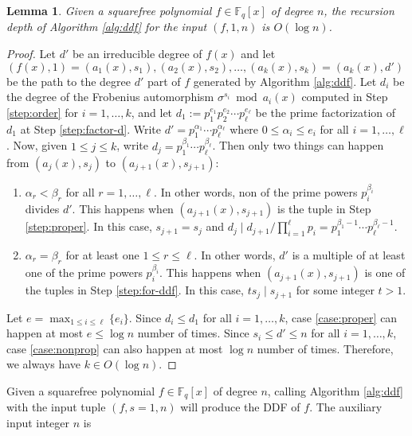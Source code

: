 \documentclass[11pt]{article}
\theoremstyle{plain}
\newtheorem{lemma}[theorem]{Lemma}
\theoremstyle{definition}
\def\F{\ensuremath{\mathbb{F}}}
\begin{document}
\begin{lemma}
	\label{lem:depth}
	Given a squarefree polynomial $f \in \F_q[x]$ of degree $n$, the recursion depth of Algorithm 
	\ref{alg:ddf} for the input $(f, 1, n)$ is $O(\log n)$.
\end{lemma}
\begin{proof}
	Let $d'$ be an irreducible degree of $f(x)$ and let $(f(x), 1) = (a_1(x), s_1), (a_2(x), s_2), 
	\dots, (a_k(x), s_k) = (a_k(x), d')$ be the path to the degree $d'$ part of $f$ generated by 
	Algorithm \ref{alg:ddf}. Let $d_i$ be the degree of the Frobenius automorphism $\sigma^{s_i} 
	\bmod a_i(x)$ computed in Step \ref{step:order} for $i = 1, \dots, k$, and let $d_1 := p_1^{e_1} 
	p_2^{e_2} \cdots p_\ell^{e_\ell}$ be the prime factorization of $d_1$ at Step 
	\ref{step:factor-d}. Write $d' = p_1^{\alpha_1} \cdots p_\ell^{\alpha_\ell}$ where $0 \le 
	\alpha_i \le e_i$ for all $i = 1, \dots, \ell$. Now, given $1 \le j \le k$, write $d_j = 
	p_1^{\beta_1} \cdots p_\ell^{\beta_\ell}$. Then only two things can happen from $(a_j(x), s_j)$ 
	to $(a_{j + 1}(x), s_{j + 1})$:
	\begin{enumerate}
		\item\label{case:proper} $\alpha_r < \beta_r$ for all $r = 1, \dots, \ell$. In other words, 
		non of the prime powers $p_i^{\beta_i}$ divides $d'$. This happens when $(a_{j + 1}(x), s_{j 
		+ 1})$ is the tuple in Step \ref{step:proper}. In this case, $s_{j + 1} = s_j$ and $d_j \mid 
		d_{j + 1} / \prod_{i = 1}^\ell p_i = p_1^{\beta_1 - 1} \cdots p_\ell^{\beta_\ell - 1}$.
		\item\label{case:nonprop} $\alpha_r = \beta_r$ for at least one $1 \le r \le \ell$. In 
		other words, $d'$ is a multiple of at least one of the prime powers $p_i^{\beta_i}$. This 
		happens when $(a_{j + 1}(x), s_{j + 1})$ is one of the tuples in Step \ref{step:for-ddf}. 
		In this case, $ts_j \mid s_{j + 1}$ for some integer $t > 1$. 
	\end{enumerate}
	Let $e = \max_{1 \le i \le \ell}\{ e_i \}$. Since $d_i \le d_1$ for all $i = 1, \dots, k$, case 
	\ref{case:proper} can happen at most $e \le \log n$ number of times. Since $s_i \le d' \le n$ 
	for all $i = 1, \dots, k$, case \ref{case:nonprop} can also happen at most $\log n$ number of 
	times. Therefore, we always have $k \in O(\log n)$. 
\end{proof}
Given a squarefree polynomial $f \in \F_q[x]$ of degree $n$, calling Algorithm \ref{alg:ddf} with 
the input tuple $(f, s = 1, n)$ will produce the DDF of $f$. The auxiliary input integer $n$ is 
\end{document}
